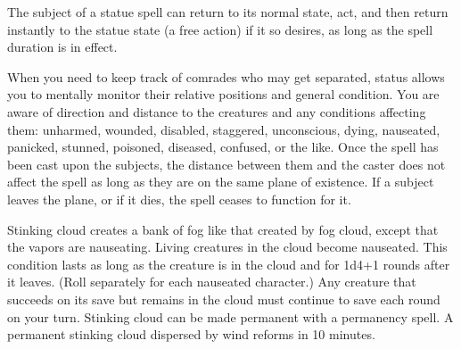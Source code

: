 \begin{multicols}{2}
\begin{small}
\smallskip\noindent The subject of a statue spell can return to its normal state, act, and then return instantly to the statue state (a free action) if it so desires, as long as the spell duration is in effect.


\noindent When you need to keep track of comrades who may get separated, status allows you to mentally monitor their relative positions and general condition. You are aware of direction and distance to the creatures and any conditions affecting them: unharmed, wounded, disabled, staggered, unconscious, dying, nauseated, panicked, stunned, poisoned, diseased, confused, or the like. Once the spell has been cast upon the subjects, the distance between them and the caster does not affect the spell as long as they are on the same plane of existence. If a subject leaves the plane, or if it dies, the spell ceases to function for it.

\noindent Stinking cloud creates a bank of fog like that created by fog cloud, except that the vapors are nauseating. Living creatures in the cloud become nauseated. This condition lasts as long as the creature is in the cloud and for 1d4+1 rounds after it leaves. (Roll separately for each nauseated character.) Any creature that succeeds on its save but remains in the cloud must continue to save each round on your turn.
Stinking cloud can be made permanent with a permanency spell. A permanent stinking cloud dispersed by wind reforms in 10 minutes.



\end{small}
\end{multicols}
